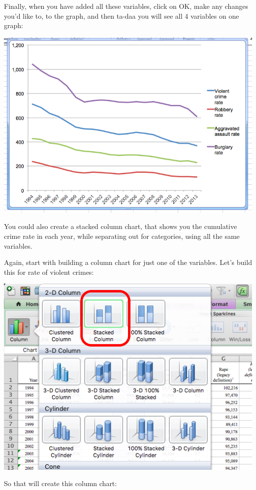 \documentclass[
]{book}
\begin{document}
Finally, when you have added all these variables, click on OK, make any changes you'd like to, to the graph, and then ta-daa you will see all 4 variables on one graph:

\includegraphics{imgs/comp_c_6.png}

You could also create a stacked column chart, that shows you the cumulative crime rate in each year, while separating out for categories, using all the same variables.

Again, start with building a column chart for just one of the variables. Let's build this for rate of violent crimes:

\includegraphics{imgs/stackedbar_1.png}

So that will create this column chart:
\end{document}
